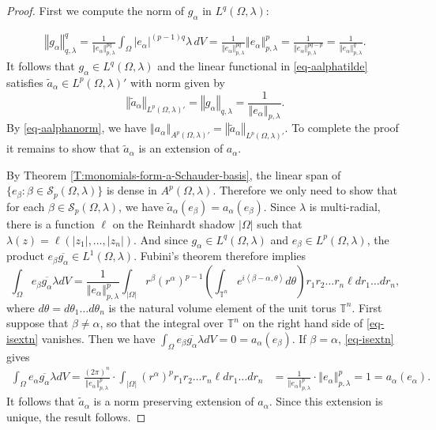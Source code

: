 \documentclass[letterpaper,11pt,reqno]{amsart}
\theoremstyle{plain}
\theoremstyle{definition}
\theoremstyle{remark}
\theoremstyle{remark}
\numberwithin{equation}{section}
\newcommand{\abs}[1]{\left\vert#1\right\vert}
\newcommand{\norm}[1]{\left\Vert#1\right\Vert}
\newcommand{\ol}{\overline}
\newcommand{\wt}{\widetilde}
\newcommand{\ipr}[1]{\left\langle #1 \right\rangle}
\begin{document}
\begin{proof} 
First we compute the norm of $g_\alpha$ in $L^q(\Omega,\lambda)$: 

\begin{align*}
\norm{g_\alpha}_{q,\lambda}^q =\frac{1}{\norm{e_\alpha}_{p,\lambda}^{pq}}\int_\Omega \abs{e_\alpha}^{(p-1)q} \lambda\, dV
=\frac{1}{\norm{e_\alpha}_{p,\lambda}^{pq}}\norm{e_\alpha}_{p,\lambda}^p= \frac{1}{\norm{e_\alpha}_{p,\lambda}^{pq-p}}=\frac{1}{\norm{e_\alpha}_{p,\lambda}^{q}}.
\end{align*}
It follows that $g_\alpha\in L^q(\Omega, \lambda) $ and the linear functional in \eqref{eq-aalphatilde} satisfies $\wt{a}_\alpha\in L^p(\Omega, \lambda)'$ with norm given by
\begin{equation}\label{eq-normaalphatilde}
\norm{\wt{a}_\alpha}_{L^p(\Omega, \lambda)'} =\norm{g_\alpha}_{q,\lambda} = \frac{1}{\norm{e_\alpha}_{p,\lambda}}.
\end{equation}
By \eqref{eq-aalphanorm}, we have $\norm{{a_\alpha}}_{A^p(\Omega, \lambda)'} = \norm{\wt{a}_\alpha}_{L^p(\Omega, \lambda)'}$.
To complete the proof it remains to show that $\wt{a}_\alpha$ is an extension of $a_\alpha$. 


By Theorem \ref{T:monomials-form-a-Schauder-basis}, the linear span of $\{e_\beta: \beta\in \mathcal{S}_p(\Omega, \lambda)\}$ is dense in  $A^p(\Omega, \lambda)$. 
Therefore we only need to show that for each $\beta\in \mathcal{S}_p(\Omega, \lambda)$, we have $\wt{a}_\alpha(e_\beta)={a_\alpha}(e_\beta)$. 
Since $\lambda$ is multi-radial, there is a function $\ell$ on the Reinhardt shadow $\abs{\Omega}$ such that  $\lambda(z)=\ell(\abs{z_1},\dots, \abs{z_n})$.
And since $g_\alpha\in L^q(\Omega, \lambda)$ and $e_\beta\in L^p(\Omega, \lambda)$, the product $e_\beta\ol{g_\alpha}\in L^1(\Omega, \lambda)$.
Fubini's theorem therefore implies
\begin{equation}\label{eq-isextn}
\int_\Omega e_\beta \ol{g_\alpha}\lambda dV= \frac{1}{\norm{e_\alpha}_{p,\lambda}^p} \int_{\abs{\Omega}} r^\beta (r^\alpha)^{p-1}\left(\int_{\mathbb{T}^n }e^{i\ipr{\beta-\alpha, \theta }}d\theta\right)r_1 r_2\dots r_n \ell dr_1\dots dr_n,
\end{equation}
where $d\theta =d\theta_1\dots d\theta_n$ is the natural volume element of the unit torus $\mathbb{T}^n$.
First suppose that $\beta\not=\alpha$, so that the integral over $\mathbb{T}^n$ on the right hand side of \eqref{eq-isextn} vanishes. 
Then we have $\int_\Omega e_\beta \ol{g_\alpha}\lambda dV =0 ={a_\alpha}(e_\beta)$.
If $\beta=\alpha$, \eqref{eq-isextn} gives
\begin{align*}
\int_\Omega e_\alpha \ol{g_\alpha}\lambda dV
= \frac{(2\pi)^n}{\norm{e_\alpha}_{p,\lambda}^p}\cdot \int_{\abs{\Omega}}  (r^\alpha)^{p}r_1 r_2\dots r_n\ell  dr_1\dots dr_n
&= \frac{1}{\norm{e_\alpha}_{p,\lambda}^p} \cdot \norm{e_\alpha}_{p,\lambda}^p= 1 = a_\alpha(e_\alpha).
\end{align*}
It follows that $\wt{a}_\alpha$ is a norm preserving extension of $a_\alpha$.  Since this extension is unique, the result follows.
\end{proof}
\end{document}
